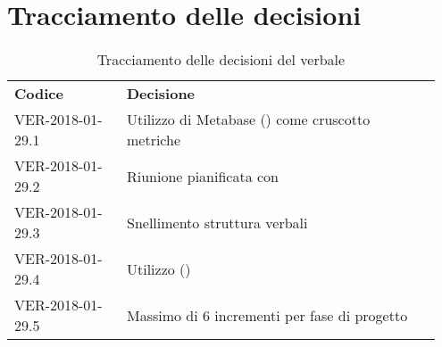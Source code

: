 \documentclass[VER-2018-01-29.tex]{subfiles}
\begin{document}
\section{Tracciamento delle decisioni}
\begin{table}[H]
	\begin{center}
		\begin{tabu} to 
			\tableHeaderStyle
			\textbf{Codice} & \textbf{Decisione} \\
			VER-2018-01-29.1 &  Utilizzo di Metabase () come cruscotto metriche\\
			VER-2018-01-29.2 &  Riunione pianificata con \Vardanega \\  
			VER-2018-01-29.3 &  Snellimento struttura verbali\\
			VER-2018-01-29.4 &  Utilizzo  ()\\
			VER-2018-01-29.5 &  Massimo di 6 incrementi per fase di progetto\\
		\end{tabu}
		\caption{Tracciamento delle decisioni del verbale}
	\end{center}
\end{table}
\end{document}
